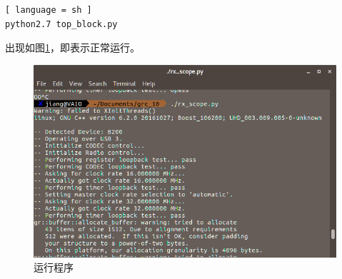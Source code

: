 		\begin{lstlisting}[ language = sh ]
python2.7 top_block.py
		\end{lstlisting}
		\par 出现如图\ref{fig:dvbt_runtime}，即表示正常运行。
		\begin{figure}[htp]
			\centering
			\includegraphics[width=13cm]{figures/dvbt_runtime.png}
			\caption{运行程序}
			\label{fig:dvbt_runtime}
		\end{figure}
		
				
